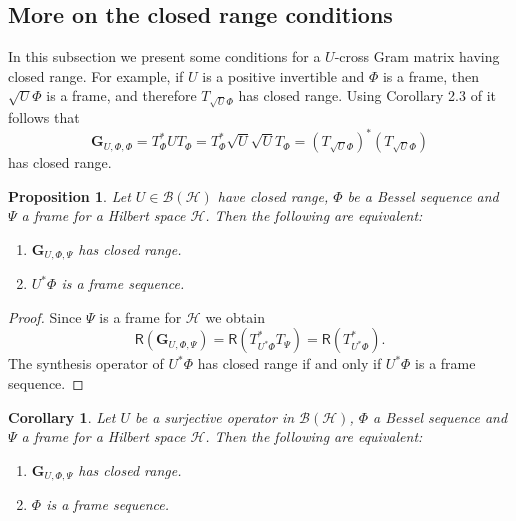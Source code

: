 \documentclass{birkjour}
\newtheorem{cor}[thm]{Corollary}
\newtheorem{prop}[thm]{Proposition}
\theoremstyle{definition}
\theoremstyle{remark}
\numberwithin{equation}{section}
\newcommand{\range}[1]{\mathsf{R}\left( #1 \right)}
\newcommand{\BL}[1]{
{\mathcal B} \left( #1 \right)
}
\begin{document}
\subsection{More on the closed range conditions} \label{sec:closedrange}


In this subsection we present some conditions for a $U$-cross Gram matrix
having closed range. For example, if $U$ is a positive invertible and
$\Phi$ is a frame, then $\sqrt{U}\Phi$ is a frame, and therefore
$T_{\sqrt{U}\Phi}$ has closed range. Using Corollary 2.3 of
\cite{olepinv} it follows that
$$\mathbf{G}_{U,\Phi,\Phi} = T_\Phi^* U T_\Phi = T_\Phi^* \sqrt{U} \sqrt{U} T_\Phi =
\left(T_{\sqrt{U}\Phi}\right)^*\left(T_{\sqrt{U}\Phi}\right)$$
has closed range.

\begin{prop} Let $U\in \BL{\mathcal{H}}$ have closed range, $\Phi$ be a Bessel sequence  and $\Psi$ a frame for a Hilbert space $\mathcal{H}$.
Then the following are equivalent:
\begin{enumerate}
\item[(1)] \label{r1}  $\mathbf{G}_{U,\Phi,\Psi}$ has closed range.
\item[(2)] \label{r2}$U^*{\Phi}$ is a frame sequence.
\end{enumerate}
\end{prop}

\begin{proof} Since $\Psi$ is a frame for $\mathcal{H}$ we obtain
\begin{equation}\label{Gram cr}
 \range{\mathbf{G}_{U,\Phi,\Psi}}= \range{T_{U^*\Phi}^*T_{\Psi}} =
\range{T_{U^*\Phi}^*}. \end{equation}
The synthesis operator of $U^*{\Phi}$ has closed range \cite{xxlstoeant11,ole1n} 
if and only if $U^*{\Phi}$ is a frame sequence.
\end{proof}
\begin{cor}

Let $U$ be a surjective operator in $\BL{\mathcal{H}}$, $\Phi$  a
Bessel sequence and $\Psi$ a frame for a Hilbert space $\mathcal{H}$. Then the
following are equivalent:
\begin{enumerate}
\item[(1)]   $\mathbf{G}_{U,\Phi,\Psi}$ has closed range. \item[(2)]  ${\Phi}$
is a frame sequence.
\end{enumerate}
\end{cor}
\end{document}
